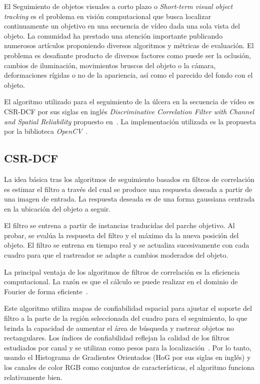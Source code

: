 El Seguimiento de objetos visuales a corto plazo o \textit{Short-term visual object tracking} es el problema en visión computacional que busca localizar continuamente un objetivo en una secuencia de vídeo dada una sola vista del objeto. La comunidad ha prestado una atención importante publicando numerosos artículos proponiendo diversos algoritmos y métricas de evaluación. El problema es desafiante producto de diversos factores como puede ser la oclusión, cambios de iluminación, movimientos bruscos del objeto o la cámara, deformaciones rígidas o no de la apariencia, así como el parecido del fondo con el objeto.	

El algoritmo utilizado para el seguimiento de la úlcera en la secuencia de vídeo es CSR-DCF por sus siglas en inglés \textit{Discriminative Correlation Filter with Channel and Spatial Reliability} propuesto en~\cite{lunevzivc2018discriminative}. La implementación utilizada es la propuesta por la biblioteca \textit{OpenCV}~\cite{bradski2000opencv}.

\subsection{CSR-DCF}\label{sec:csr}

La idea básica tras los algoritmos de seguimiento basados en filtros de correlación es estimar el filtro a través del cual se produce una respuesta deseada a partir de una imagen de entrada. La respuesta deseada es de una forma gaussiana centrada en la ubicación del objeto a seguir.

El filtro se entrena a partir de instancias traducidas del parche objetivo. Al probar, se evalúa la respuesta del filtro y el máximo da la nueva posición del objeto. El filtro se entrena en tiempo real y se actualiza sucesivamente con cada cuadro para que el rastreador se adapte a cambios moderados del objeto.

La principal ventaja de los algoritmos de filtros de correlación es la eficiencia computacional. La razón es que el cálculo se puede realizar en el dominio de Fourier de forma eficiente~\cite{henriques2014high}. 

Este algoritmo utiliza mapas de confiabilidad espacial para ajustar el soporte del filtro a la parte de la región seleccionada del cuadro para el seguimiento, lo que brinda la capacidad de aumentar el área de búsqueda y rastrear objetos no rectangulares. Los índices de confiabilidad reflejan la calidad de los filtros estudiados por canal y se utilizan como pesos para la localización~\cite{lunevzivc2018discriminative}. Por lo tanto, usando el Histograma de Gradientes Orientados (HoG por sus siglas en inglés) y los canales de color RGB como conjuntos de características, el algoritmo funciona relativamente bien.


